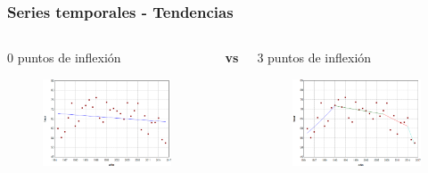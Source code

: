 \documentclass{beamer}
\begin{document}
\begin{frame}\frametitle{Series temporales - Tendencias}
	\begin{columns}
		\begin{column}{0.5\textwidth}
			\centering \normalsize 0 puntos de inflexión
			\begin{figure}
				\includegraphics[width=\textwidth]{images/jpo0.png}
			\end{figure}
			
		\end{column}
		\large{\textbf{vs}}
		\begin{column}{0.5\textwidth}
			\centering \normalsize 3 puntos de inflexión
			\begin{figure}
				\centering
				\includegraphics[width=\textwidth]{images/jpo3.png}
			\end{figure}
		\end{column}
	\end{columns}
\end{frame}
\end{document}
